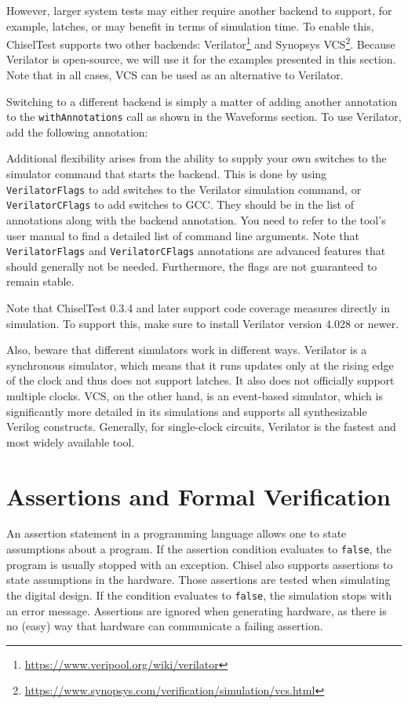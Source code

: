 \documentclass[%
    10pt,
    headinclude, footexclude,
    openright, %
    notitlepage,
    cleardoubleempty,
    headsepline,
    pointlessnumbers,
    bibtotoc, idxtotoc,
    ]{scrbook}
\newcommand{\code}[1]{{\lstinline[basicstyle=\small\ttfamily]{#1}}}
\newcommand{\myref}[2]{\href{#1}{#2}}
\renewcommand{\myref}[2]{{#2}{\footnote{\url{#1}}}}
\begin{document}
However,
larger system tests may either require another backend to support, for example, latches, or may
benefit in terms of simulation time. To enable this, ChiselTest supports two other backends:
\myref{https://www.veripool.org/wiki/verilator}{Verilator} and
\myref{https://www.synopsys.com/verification/simulation/vcs.html}{Synopsys VCS}. Because
Verilator is open-source, we will use it for the examples presented in this section. Note
that in all cases, VCS can be used as an alternative to Verilator.

Switching to a different backend is simply a matter of adding another annotation to the
\code{withAnnotations} call as shown in the Waveforms section. To use Verilator, add the following
annotation:


Additional flexibility arises from the ability to supply your own switches to the
simulator command that starts the backend. This is done by using \code{VerilatorFlags}
to add switches to the Verilator simulation command, or \code{VerilatorCFlags} to add
switches to GCC. They should be in the list of annotations along with the backend
annotation. You need to refer to the tool's user manual  to find a detailed list of command line arguments.
Note that \code{VerilatorFlags} and \code{VerilatorCFlags} annotations are advanced features
that should generally not be needed. Furthermore, the flags are not guaranteed to remain stable.

Note that ChiselTest 0.3.4 and later support code coverage measures directly in simulation.
To support this, make sure to install Verilator version 4.028 or newer.

Also, beware that different simulators work in different ways. Verilator is a
synchronous simulator, which means that it runs updates only at the rising edge of the
clock and thus does not support latches. It also does not officially support multiple
clocks. VCS, on the other hand, is an event-based simulator, which is significantly more
detailed in its simulations and supports all synthesizable Verilog constructs.
Generally, for single-clock circuits, Verilator is the fastest and
most widely available tool.

\section{Assertions and Formal Verification}

An assertion statement in a programming language allows one to state assumptions about a program.
If the assertion condition evaluates to \code{false}, the program is usually stopped with an exception.
Chisel also supports assertions to state assumptions in the hardware. Those assertions are tested
when simulating the digital design. If the condition evaluates to \code{false}, the simulation stops
with an error message. Assertions are ignored when generating hardware, as there is no (easy) way that
hardware can communicate a failing assertion.
\end{document}
